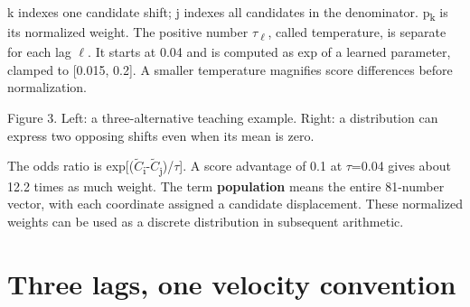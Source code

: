 \documentclass[11pt,letterpaper]{article}
\begin{document}
k indexes one candidate shift; j indexes all candidates in the denominator. p\textsubscript{k} is its normalized weight. The positive number \(\tau\)\textsubscript{\(\ell\)}, called temperature, is separate for each lag \(\ell\). It starts at 0.04 and is computed as exp of a learned parameter, clamped to [0.015, 0.2]. A smaller temperature magnifies score differences before normalization.


\begin{center}\end{center}

{
\small\color{muted} Figure 3. Left: a three-alternative teaching example. Right: a distribution can express two opposing shifts even when its mean is zero.\par}


The odds ratio is exp[(\(\widetilde C\)\textsubscript{i}-\(\widetilde C\)\textsubscript{j})/\allowbreak{}\(\tau\)]. A score advantage of 0.1 at \(\tau\)=0.04 gives about 12.2 times as much weight. The term \textbf{population} means the entire 81-number vector, with each coordinate assigned a candidate displacement. These normalized weights can be used as a discrete distribution in subsequent arithmetic.


\clearpage

\section{Three lags, one velocity convention}\label{sec8}
\end{document}
